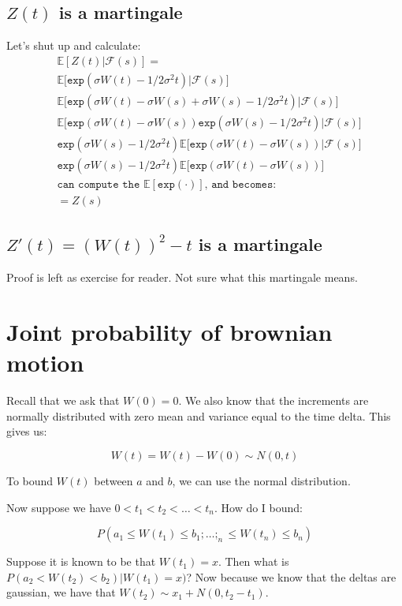 \documentclass{book}
\newcommand{\F}{\ensuremath{\mathcal{F}}}
\newcommand{\E}{\ensuremath{\mathbb{E}}}
\theoremstyle{definition}
\begin{document}
\subsection{$Z(t)$ is a martingale}
Let's shut up and calculate:
\begin{align*}
&\E[Z(t)|\F(s)]  = \\
&\E\bigg[\texttt{exp}\left( \sigma W(t) - 1/2 \sigma^2 t \right) | \F(s) \bigg] \\
&\E\bigg[\texttt{exp}\left( \sigma W(t) - \sigma W(s) + \sigma W(s) - 1/2 \sigma^2 t \right) | \F(s) \bigg] \\
&\E\bigg[\texttt{exp}\left( \sigma W(t) - \sigma W(s) \right) \texttt{exp} \left(\sigma W(s) - 1/2 \sigma^2 t \right) | \F(s) \bigg] \\
& \texttt{exp} \left(\sigma W(s) - 1/2 \sigma^2 t \right) \E\bigg[\texttt{exp}\left( \sigma W(t) - \sigma W(s) \right) | \F(s) \bigg] \\
& \texttt{exp} \left(\sigma W(s) - 1/2 \sigma^2 t \right) \E\bigg[\texttt{exp}\left( \sigma W(t) - \sigma W(s) \right)\bigg] \\
&\texttt{can compute the $\E[\texttt{exp}(\cdot)]$, and becomes:} \\
& = Z(s)
\end{align*}

\subsection{$Z'(t) = (W(t))^2 - t$ is a martingale}
Proof is left as exercise for reader. Not sure what this martingale means.

\section{Joint probability of brownian motion}
Recall that we ask that $W(0) = 0$.  We also know that the increments
are normally distributed with zero mean and variance equal to the time delta.
This gives us:

$$W(t) = W(t) - W(0) \sim N(0, t) $$

To bound $W(t)$ between $a$ and $b$, we can use the normal distribution. 


Now suppose we have $0 < t_1 < t_2 < \dots < t_n$. How do I bound:

$$
P(a_1 \leq W(t_1) \leq b_1; \dots; _n \leq W(t_n) \leq b_n)
$$

Suppose it is known to be that $W(t_1) = x$. Then what is $P(a_2 < W(t_2) < b_2) | W(t_1) = x)$?
Now because we know that the deltas are gaussian, we have that $W(t_2) \sim x_1 + N(0, t_2 - t_1)$.
\end{document}
